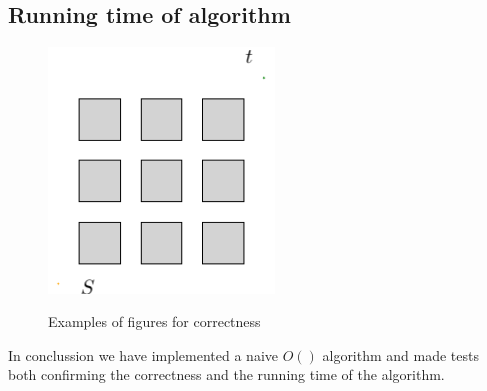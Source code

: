 \subsection{Running time of algorithm}
\begin{figure}[H]
	\caption{Examples of figures for correctness}
		\includegraphics[width=6cm]{figures/testexample.pdf}
		\label{fig:correctness_2}
\end{figure}









In conclussion we have implemented a naive $O()$ algorithm and made tests both
confirming the correctness and the running time of the algorithm.

